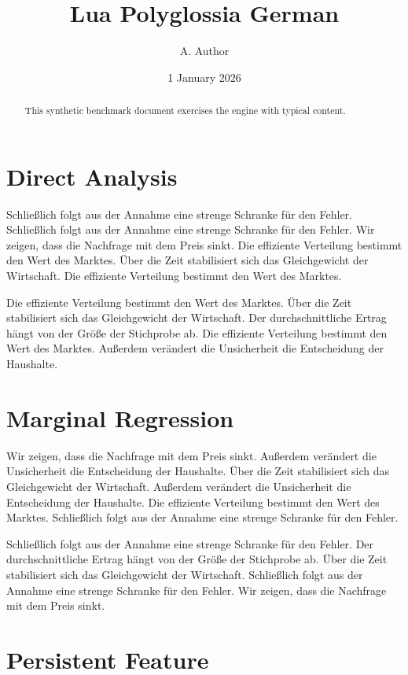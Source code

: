\documentclass[11pt]{article}
\title{Lua Polyglossia German}
\author{A. Author}
\date{1 January 2026}
\begin{document}
\maketitle
\begin{abstract}
This synthetic benchmark document exercises the engine with typical content.
\end{abstract}
\tableofcontents
\section{Direct Analysis}\label{sec:1}

Schließlich folgt aus der Annahme eine strenge Schranke für den Fehler. Schließlich folgt aus der Annahme eine strenge Schranke für den Fehler. Wir zeigen, dass die Nachfrage mit dem Preis sinkt. Die effiziente Verteilung bestimmt den Wert des Marktes. Über die Zeit stabilisiert sich das Gleichgewicht der Wirtschaft. Die effiziente Verteilung bestimmt den Wert des Marktes.

Die effiziente Verteilung bestimmt den Wert des Marktes. Über die Zeit stabilisiert sich das Gleichgewicht der Wirtschaft. Der durchschnittliche Ertrag hängt von der Größe der Stichprobe ab. Die effiziente Verteilung bestimmt den Wert des Marktes. Außerdem verändert die Unsicherheit die Entscheidung der Haushalte.

\section{Marginal Regression}\label{sec:2}

Wir zeigen, dass die Nachfrage mit dem Preis sinkt. Außerdem verändert die Unsicherheit die Entscheidung der Haushalte. Über die Zeit stabilisiert sich das Gleichgewicht der Wirtschaft. Außerdem verändert die Unsicherheit die Entscheidung der Haushalte. Die effiziente Verteilung bestimmt den Wert des Marktes. Schließlich folgt aus der Annahme eine strenge Schranke für den Fehler.

Schließlich folgt aus der Annahme eine strenge Schranke für den Fehler. Der durchschnittliche Ertrag hängt von der Größe der Stichprobe ab. Über die Zeit stabilisiert sich das Gleichgewicht der Wirtschaft. Schließlich folgt aus der Annahme eine strenge Schranke für den Fehler. Wir zeigen, dass die Nachfrage mit dem Preis sinkt.

\section{Persistent Feature}\label{sec:3}
\end{document}
